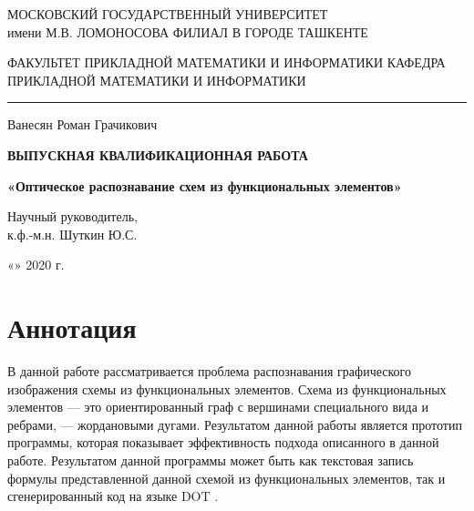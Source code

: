 \documentclass[makeidx, a4paper, 14pt]{extarticle}
\begin{document}
\begin{titlepage}
    \thispagestyle{fancy}
    \renewcommand{\headrulewidth}{0pt}
    \begin{center}
        МОСКОВСКИЙ ГОСУДАРСТВЕННЫЙ УНИВЕРСИТЕТ \\
        имени М.В. ЛОМОНОСОВА
        \medskip
        ФИЛИАЛ В ГОРОДЕ ТАШКЕНТЕ

        \bigskip
        \bigskip

        ФАКУЛЬТЕТ ПРИКЛАДНОЙ МАТЕМАТИКИ И ИНФОРМАТИКИ
        \medskip
        КАФЕДРА ПРИКЛАДНОЙ МАТЕМАТИКИ И ИНФОРМАТИКИ

        \bigskip
        \hrule
        \bigskip

        \large{Ванесян Роман Грачикович}

        \bigskip
        \bigskip

        \textbf{ВЫПУСКНАЯ КВАЛИФИКАЦИОННАЯ РАБОТА}

        \bigskip
        \bigskip

        \textbf{«Оптическое распознавание схем из функциональных элементов»}

        \bigskip
        \bigskip
        \bigskip
        \bigskip
        \bigskip
        \bigskip

        \begin{small}
            \begin{flushleft}
              Научный руководитель, \\
              к.ф.-м.н. \underline{\hspace{10cm}} Шуткин Ю.С.
            \end{flushleft}

            \smallskip

            \begin{flushright}
              «\underline{\hspace{1cm}}» \underline{\hspace{3.5cm}} 2020 г.
            \end{flushright}
        \end{small}

    \end{center}
\end{titlepage}

\newpage

\section*{Аннотация}
В данной работе рассматривается проблема распознавания графического изображения схемы из функциональных элементов. Схема из функциональных элементов --- это
ориентированный граф с вершинами специального вида и ребрами, --- жордановыми дугами. Результатом данной работы является прототип программы,
которая показывает эффективность подхода описанного в данной работе. Результатом данной программы может быть как текстовая запись формулы
представленной данной схемой из функциональных элементов, так и сгенерированный код на языке DOT \cite{dot_lang}.
\end{document}

